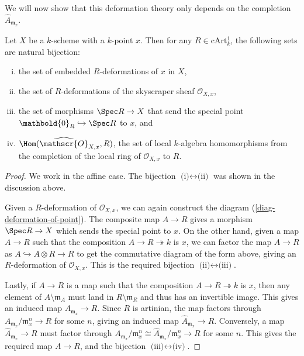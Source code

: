 We will now show that this deformation theory only depends on the completion
\(\widehat{A}_{\mathfrak{m}_x}\).

\begin{proposition}\label{prop-defthy-of-a-point}
    Let \(X\) be a \(k\)-scheme with a \(k\)-point \(x\). Then
    for any \(R\in \text{cArt}{}^1_k\), the following sets are natural
    bijection:
    \begin{enumerate}[(i)] 
        \item the set of embedded \(R\)-deformations of \(x\) in \(X\),
        \item the set of \(R\)-deformations of the skyscraper sheaf
            \(\mathscr{O}_{X,x}\),
        \item the set of morphisms \(\Spec R\rightarrow X\) that send the
            special point \(\mathbold{0}_R\hookrightarrow \Spec R\) to \(x\),
            and 
        \item \(\Hom(\widehat{\mathscr{O}}_{X,x},R)\), the set of local
            \(k\)-algebra homomorphisms from the completion of the local ring of
            \(\mathscr{O}_{X,x}\) to \(R\).
    \end{enumerate}
    \begin{proof}
        We work in the affine case. The bijection
        \(\text{(i)}\leftrightarrow\text{(ii)}\) was shown in the discussion
        above. 

        Given a \(R\)-deformation of \(\mathscr{O}_{X,x}\), we can again
        construct the diagram (\ref{diag-deformation-of-point}). The composite
        map \(A\rightarrow R\) gives a morphism \(\Spec R \rightarrow X\) which
        sends the special point to \(x\). On the other hand, given a map
        \(A\rightarrow R\) such that the composition \(A\rightarrow R
        \twoheadrightarrow k\) is \(x\), we can factor the map \(A\rightarrow
        R\) as \(A\hookrightarrow A\otimes R \rightarrow R\) to get the
        commutative diagram of the form above, giving an \(R\)-deformation of
        \(\mathscr{O}_{X,x}\). This is the required bijection
        \(\text{(ii)}\leftrightarrow \text{(iii)}\).

        Lastly, if \(A\rightarrow R\) is a map such that the composition
        \(A\rightarrow R \twoheadrightarrow k\) is \(x\), then any element of
        \(A\setminus \mathfrak{m}_A\) must land in \(R\setminus \mathfrak{m}_R\)
        and thus has an invertible image. This gives an induced map
        \(A_{\mathfrak{m}_x}\rightarrow R\). Since \(R\) is artinian, the map
        factors through \(A_{\mathfrak{m}_x}/\mathfrak{m}_x^n\rightarrow R\) for
        some \(n\), giving an induced map
        \(\widehat{A}_{\mathfrak{m}_x}\rightarrow R\). Conversely, a map
        \(\widehat{A}_{\mathfrak{m}_x}\rightarrow R\) must factor through 
        \(A_{\mathfrak{m}_x}/\mathfrak{m}_x^n \cong
        \widehat{A}_{\mathfrak{m}_x}/\mathfrak{m}_x^n\rightarrow R\) for some
        \(n\). This gives the required map \(A\rightarrow R\), and the bijection
        \(\text{(iii)}\leftrightarrow \text{(iv)}\).
    \end{proof}
\end{proposition}

